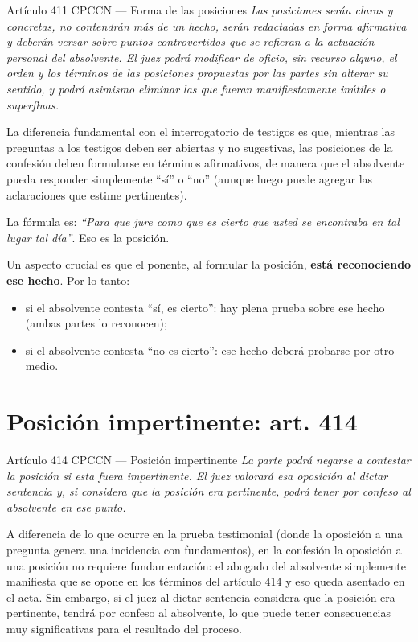 \documentclass[12pt,oneside]{book}
\begin{document}
\begin{norma}{Artículo 411 CPCCN --- Forma de las posiciones}
\textit{Las posiciones serán claras y concretas, no contendrán más de un hecho, serán redactadas en forma afirmativa y deberán versar sobre puntos controvertidos que se refieran a la actuación personal del absolvente. El juez podrá modificar de oficio, sin recurso alguno, el orden y los términos de las posiciones propuestas por las partes sin alterar su sentido, y podrá asimismo eliminar las que fueran manifiestamente inútiles o superfluas.}
\end{norma}

La diferencia fundamental con el interrogatorio de testigos es que, mientras las preguntas a los testigos deben ser abiertas y no sugestivas, las posiciones de la confesión deben formularse en términos afirmativos, de manera que el absolvente pueda responder simplemente ``sí'' o ``no'' (aunque luego puede agregar las aclaraciones que estime pertinentes).

La fórmula es: \textit{``Para que jure como que es cierto que usted se encontraba en tal lugar tal día''}. Eso es la posición.

Un aspecto crucial es que el ponente, al formular la posición, \textbf{está reconociendo ese hecho}. Por lo tanto:
\begin{itemize}
    \item si el absolvente contesta ``sí, es cierto'': hay plena prueba sobre ese hecho (ambas partes lo reconocen);
    \item si el absolvente contesta ``no es cierto'': ese hecho deberá probarse por otro medio.
\end{itemize}

\section{Posición impertinente: art. 414}

\begin{norma}{Artículo 414 CPCCN --- Posición impertinente}
\textit{La parte podrá negarse a contestar la posición si esta fuera impertinente. El juez valorará esa oposición al dictar sentencia y, si considera que la posición era pertinente, podrá tener por confeso al absolvente en ese punto.}
\end{norma}

A diferencia de lo que ocurre en la prueba testimonial (donde la oposición a una pregunta genera una incidencia con fundamentos), en la confesión la oposición a una posición no requiere fundamentación: el abogado del absolvente simplemente manifiesta que se opone en los términos del artículo 414 y eso queda asentado en el acta. Sin embargo, si el juez al dictar sentencia considera que la posición era pertinente, tendrá por confeso al absolvente, lo que puede tener consecuencias muy significativas para el resultado del proceso.
\end{document}
